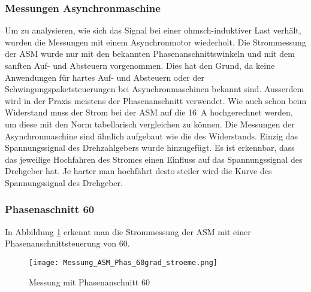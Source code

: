\newpage
\subsubsection{Messungen Asynchronmaschine}
Um zu analysieren, wie sich das Signal bei einer ohmsch-induktiver Last verhält, wurden die Messungen mit einem Asynchronmotor wiederholt. Die Strommessung der ASM wurde nur mit den bekannten Phasenanschnittswinkeln und mit dem sanften Auf- und Absteuern vorgenommen. Dies hat den Grund, da keine Anwendungen für hartes Auf- und Absteuern oder der Schwingungspaketsteuerungen bei Asynchronmaschinen bekannt sind. Ausserdem wird in der Praxis meistens der Phasenanschnitt verwendet. Wie auch schon beim Widerstand muss der Strom bei der ASM auf die \SI{16}{A} hochgerechnet werden, um diese mit den Norm tabellarisch vergleichen zu können. Die Messungen der Asynchronmaschine sind ähnlich aufgebaut wie die des Widerstands. Einzig das Spannungssignal des Drehzahlgebers wurde hinzugefügt. Es ist erkennbar, dass das jeweilige Hochfahren des Stromes einen Einfluss auf das Spannungssignal des Drehgeber hat. Je harter man hochfährt desto steiler wird die Kurve des Spannungssignal des Drehgeber. 


\subsubsection*{Phasenaschnitt 60\textdegree}
In Abbildung \ref{fig:Mess_Phas_60grad_stroeme} erkennt man die Strommessung der ASM mit einer Phasenanschnittsteuerung von 60\textdegree\hspace{0.02cm}.

\begin{figure}[ht!]
	\centering
	\texttt{[image: Messung\_ASM\_Phas\_60grad\_stroeme.png]}	
	\caption{Messung mit Phasenanschnitt 60\textdegree}\label{fig:Mess_Phas_60grad_stroeme}
\end{figure}

